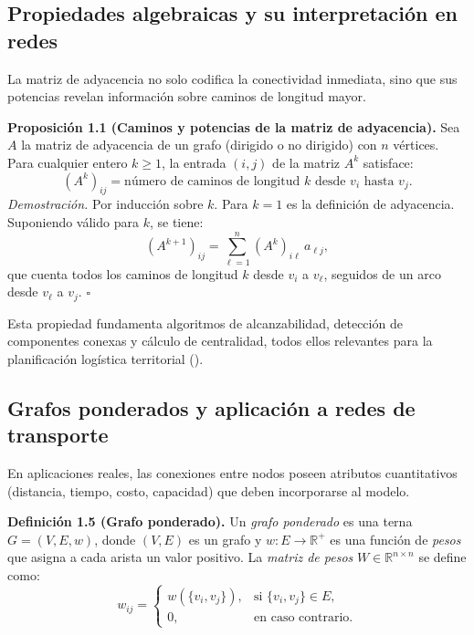 \documentclass[
  spanish,
  us-letterpaper,
]{scrreprt}
\numberwithin{equation}{section}
\begin{document}
\subsection{Propiedades algebraicas y su interpretación en
redes}\label{propiedades-algebraicas-y-su-interpretaciuxf3n-en-redes}

La matriz de adyacencia no solo codifica la conectividad inmediata, sino
que sus potencias revelan información sobre caminos de longitud mayor.

\textbf{Proposición 1.1 (Caminos y potencias de la matriz de
adyacencia).} Sea \(A\) la matriz de adyacencia de un grafo (dirigido o
no dirigido) con \(n\) vértices. Para cualquier entero \(k \geq 1\), la
entrada \((i,j)\) de la matriz \(A^k\) satisface: \[
(A^k)_{ij} = \text{número de caminos de longitud } k \text{ desde } v_i \text{ hasta } v_j.
\] \emph{Demostración.} Por inducción sobre \(k\). Para \(k=1\) es la
definición de adyacencia. Suponiendo válido para \(k\), se tiene: \[
(A^{k+1})_{ij} = \sum_{\ell=1}^n (A^k)_{i\ell} \, a_{\ell j},
\] que cuenta todos los caminos de longitud \(k\) desde \(v_i\) a
\(v_\ell\), seguidos de un arco desde \(v_\ell\) a \(v_j\). \(\square\)

Esta propiedad fundamenta algoritmos de alcanzabilidad, detección de
componentes conexas y cálculo de centralidad, todos ellos relevantes
para la planificación logística territorial
().

\subsection{Grafos ponderados y aplicación a redes de
transporte}\label{grafos-ponderados-y-aplicaciuxf3n-a-redes-de-transporte}

En aplicaciones reales, las conexiones entre nodos poseen atributos
cuantitativos (distancia, tiempo, costo, capacidad) que deben
incorporarse al modelo.

\textbf{Definición 1.5 (Grafo ponderado).} Un \emph{grafo ponderado} es
una terna \(G = (V, E, w)\), donde \((V,E)\) es un grafo y
\(w: E \to \mathbb{R}^+\) es una función de \emph{pesos} que asigna a
cada arista un valor positivo. La \emph{matriz de pesos}
\(W \in \mathbb{R}^{n \times n}\) se define como: \[
w_{ij} = 
\begin{cases}
w(\{v_i,v_j\}), & \text{si } \{v_i,v_j\} \in E, \\
0, & \text{en caso contrario}.
\end{cases}
\]
\end{document}
